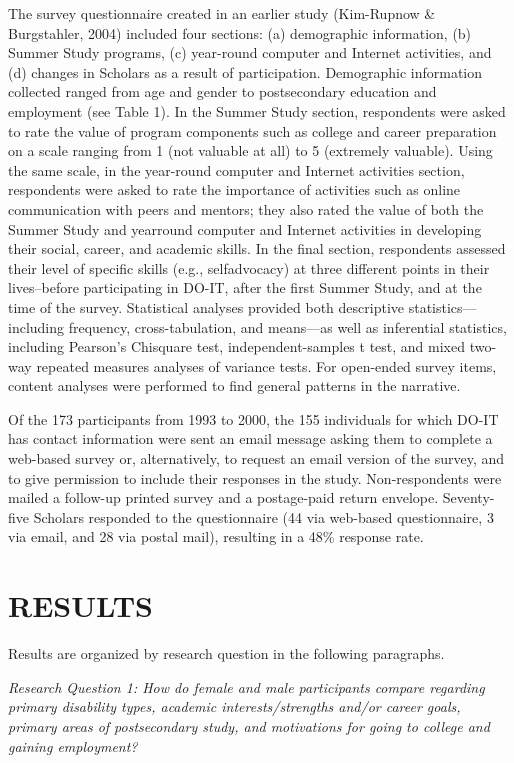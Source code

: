 \documentclass[11.5pt]{sig-alternate} %
\begin{document}
\begin{large}
The survey questionnaire created in an earlier study (Kim-Rupnow \& Burgstahler, 2004) included four sections: (a) demographic information, (b) Summer Study programs, (c) year-round computer and Internet activities, and (d) changes in Scholars as a result of participation. Demographic information collected ranged from age and gender to postsecondary education and employment (see Table 1). In the Summer Study section, respondents were asked to rate the value of program components such as college and career preparation on a scale ranging from 1 (not valuable at all) to 5 (extremely valuable). Using the same scale, in the year-round computer and Internet activities section, respondents were asked to rate the importance of activities such as online communication with peers and mentors; they also rated the value of both the Summer Study and yearround computer and Internet activities in developing their social, career, and academic skills. In the final section, respondents assessed their level of specific skills (e.g., selfadvocacy) at three different points in their lives–before participating in DO-IT, after the first Summer Study, and at the time of the survey. Statistical analyses provided both descriptive statistics—including frequency, cross-tabulation, and means—as well as inferential statistics, including Pearson’s Chisquare test, independent-samples t test, and mixed two-way repeated measures analyses of variance tests. For open-ended survey items, content analyses were performed to find general patterns in the narrative. 
 
Of the 173 participants from 1993 to 2000, the 155 individuals for which DO-IT has contact information were sent an email message asking them to complete a web-based survey or, alternatively, to request an email version of the survey, and to give permission to include their responses in the study. Non-respondents were mailed a follow-up printed survey and a postage-paid return envelope. Seventy-five Scholars responded to the questionnaire (44 via web-based questionnaire, 3 via email, and 28 via postal mail), resulting in a 48\% response rate.  
 
\section*{RESULTS}
 
Results are organized by research question in the following paragraphs. 
 
\textit{Research Question 1: How do female and male participants compare regarding primary disability types, academic interests/strengths and/or career goals, primary areas of postsecondary study, and motivations for going to college and gaining employment?}
 

\end{large}
\end{document}
